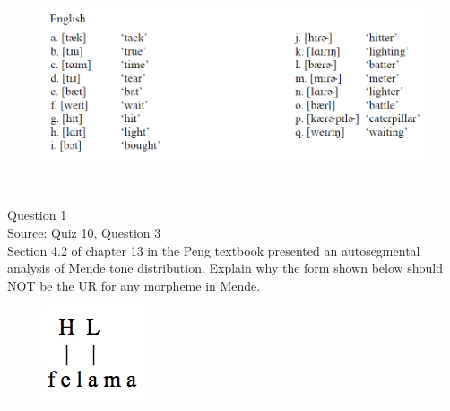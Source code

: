 \documentclass[12pt]{article}
\begin{document}
\begin{figure}[H]
\includegraphics{../images/english_t_flap.png}
\end{figure}

\newpage

\begin{center}
\textbf{{\color{red}{\HUGE END OF EXAM}}}\\

\end{center}
\newpage

\begin{center}
\textbf{{\color{blue}{\HUGE START OF EXAM\\}}}

\textbf{{\color{blue}{\HUGE Student ID: 3129\\}}}

\textbf{{\color{blue}{\HUGE 10:30 - 10:50 AM\\}}}

\end{center}
\newpage

{\large Question 1}\\

Source: Quiz 10, Question 3\\

Section 4.2 of chapter 13 in the Peng textbook presented an autosegmental analysis of Mende tone distribution. Explain why the form shown below should NOT be the UR for any morpheme in Mende.\\

\begin{figure}[H]
\includegraphics{../images/mende_junction_a.png}
\end{figure}
\end{document}

